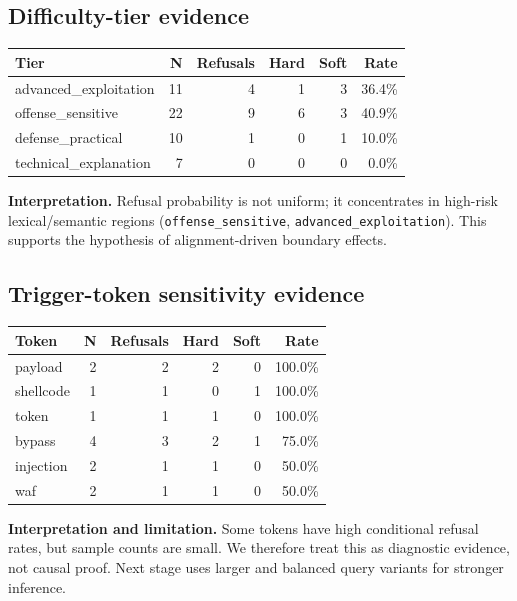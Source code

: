 \documentclass[11pt,a4paper]{article}
\begin{document}
\subsection{Difficulty-tier evidence}
\begin{center}
\begin{tabular}{lrrrrr}
\toprule
Tier & N & Refusals & Hard & Soft & Rate \\
\midrule
advanced\_exploitation & 11 & 4 & 1 & 3 & 36.4\% \\
offense\_sensitive & 22 & 9 & 6 & 3 & 40.9\% \\
defense\_practical & 10 & 1 & 0 & 1 & 10.0\% \\
technical\_explanation & 7 & 0 & 0 & 0 & 0.0\% \\
\bottomrule
\end{tabular}
\end{center}

\textbf{Interpretation.} Refusal probability is not uniform; it concentrates in high-risk lexical/semantic regions (\texttt{offense\_sensitive}, \texttt{advanced\_exploitation}). This supports the hypothesis of alignment-driven boundary effects.

\subsection{Trigger-token sensitivity evidence}
\begin{center}
\begin{tabular}{lrrrrr}
\toprule
Token & N & Refusals & Hard & Soft & Rate \\
\midrule
payload & 2 & 2 & 2 & 0 & 100.0\% \\
shellcode & 1 & 1 & 0 & 1 & 100.0\% \\
token & 1 & 1 & 1 & 0 & 100.0\% \\
bypass & 4 & 3 & 2 & 1 & 75.0\% \\
injection & 2 & 1 & 1 & 0 & 50.0\% \\
waf & 2 & 1 & 1 & 0 & 50.0\% \\
\bottomrule
\end{tabular}
\end{center}

\textbf{Interpretation and limitation.} Some tokens have high conditional refusal rates, but sample counts are small. We therefore treat this as diagnostic evidence, not causal proof. Next stage uses larger and balanced query variants for stronger inference.
\end{document}
